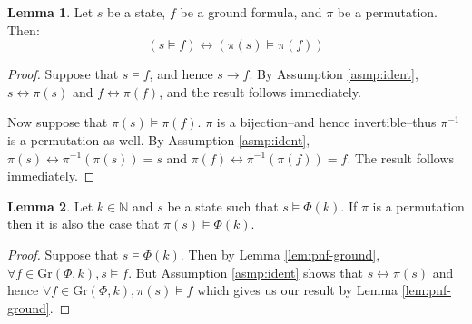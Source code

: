 \documentclass[12pt]{article}
\theoremstyle{definition}
\newtheorem{lemma}{Lemma}
\theoremstyle{remark}
\newcommand{\gr}{\text{Gr}}
\begin{document}
\begin{lemma}
  \label{lem:state-sat-perm}
  Let $s$ be a state, $f$ be a ground formula, and $\pi$ be a permutation.  Then:
  $$(s \models f) \leftrightarrow (\pi(s) \models \pi(f))$$
\end{lemma}
\begin{proof}
  Suppose that $s \models f$, and hence $s \rightarrow f$.  By Assumption \ref{asmp:ident}, $s \leftrightarrow \pi(s)$ and $f \leftrightarrow \pi(f)$, and the result follows immediately.

  Now suppose that $\pi(s) \models \pi(f)$.  $\pi$ is a bijection--and hence invertible--thus $\pi^{-1}$ is a permutation as well.  By Assumption \ref{asmp:ident}, $\pi(s) \leftrightarrow \pi^{-1}(\pi(s)) = s$ and $\pi(f) \leftrightarrow \pi^{-1}(\pi(f)) = f$.  The result follows immediately.
\end{proof}

\begin{lemma}
  \label{lem:state-perm}
  Let $k \in \mathbb{N}$ and $s$ be a state such that $s \models \Phi(k)$.  If $\pi$ is a permutation then it is also the case that $\pi(s) \models \Phi(k)$.
\end{lemma}
\begin{proof}
  Suppose that $s \models \Phi(k)$.  Then by Lemma \ref{lem:pnf-ground}, $\forall f \in \gr(\Phi,k), s \models f$.  But Assumption \ref{asmp:ident} shows that $s \leftrightarrow \pi(s)$ and hence $\forall f \in \gr(\Phi,k), \pi(s) \models f$ which gives us our result by Lemma \ref{lem:pnf-ground}.
\end{proof}
\end{document}
